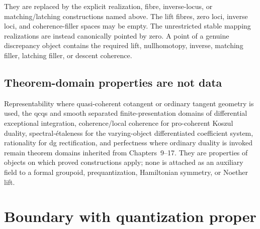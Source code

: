 They are replaced by the explicit realization, fibre, inverse-locus, or
matching/latching constructions named above.  The lift fibres, zero loci,
inverse loci, and coherence-filler spaces may be empty.  The unrestricted stable
mapping realizations are instead canonically pointed by zero.  A point of a
genuine discrepancy object contains the required lift, nullhomotopy, inverse,
matching filler, latching filler, or descent coherence.

\subsection{Theorem-domain properties are not data}
\label{subsec:prequantum-audit-theorem-domain-properties}

Representability where quasi-coherent cotangent or ordinary tangent geometry is
used, the qcqs and smooth separated finite-presentation domains of differential
exceptional integration, coherence/local coherence for pro-coherent Koszul
duality, spectral-\'etaleness for the varying-object differentiated coefficient
system, rationality for dg rectification, and perfectness where ordinary duality
is invoked remain theorem domains inherited from Chapters~9--17.  They are
properties of objects on which proved constructions apply; none is attached as an
auxiliary field to a formal groupoid, prequantization, Hamiltonian symmetry, or
Noether lift.

\section{Boundary with quantization proper}
\label{sec:prequantum-boundary-quantization-proper}

